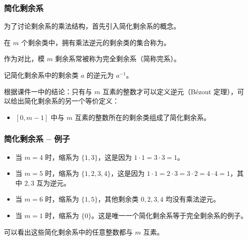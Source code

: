 \documentclass{../pkslide}
\begin{document}
\begin{frame}
  \frametitle{简化剩余系}
  为了讨论剩余系的乘法结构，首先引入简化剩余系的概念。
  
  \begin{definition}[简化剩余系]
    在 $m$ 个剩余类中，拥有乘法逆元的剩余类的集合称为。
    
    作为对比，模 $m$ 剩余系常被称为完全剩余系（简称完系）。
    
    记简化剩余系中的剩余类 $a$ 的逆元为 $a^{-1}$。
  \end{definition}
  
  \pause
  \emptyline
  根据课件一中的结论：只有与 $m$ 互素的整数才可以定义逆元（Bézout 定理），可以给出简化剩余系的另一个等价定义：
  
  \begin{itemize}
    \item $[0, m - 1]$ 中与 $m$ 互素的整数所在的剩余类组成了简化剩余系。
  \end{itemize}
  
  
\end{frame}

\begin{frame}
  \frametitle{简化剩余系 -- 例子}
  \begin{example}[简化剩余系]
    \begin{itemize}
      \item 当 $m = 4$ 时，缩系为 $\{ 1, 3 \}$，这是因为 $1 \cdot 1 = 3 \cdot 3 = 1$。
      \item 当 $m = 5$ 时，缩系为 $\{ 1, 2, 3, 4 \}$，这是因为 $1 \cdot 1 = 2 \cdot 3 = 3 \cdot 2 = 4 \cdot 4 = 1$，其中 $2, 3$ 互为逆元。
      \item 当 $m = 6$ 时，缩系为 $\{ 1, 5 \}$，其他剩余类 $0, 2, 3, 4$ 均没有乘法逆元。
      \item 当 $m = 1$ 时，缩系为 $\{ 0 \}$。这是唯一一个简化剩余系等于完全剩余系的例子。
    \end{itemize}
  \end{example}
  
  可以看出这些简化剩余系中的任意整数都与 $m$ 互素。
\end{frame}
\end{document}

